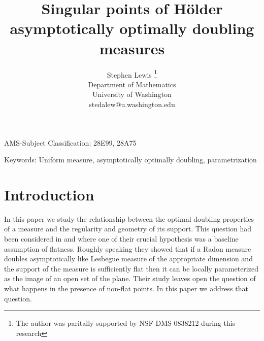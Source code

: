 \documentclass[11pt]{article}
\theoremstyle{definition}
\numberwithin{equation}{section}
\begin{document}
\title{Singular points of H\"older asymptotically optimally doubling measures}
\author{Stephen Lewis
\footnote{The author was paritally supported by NSF DMS 0838212 during this research}
\\ Department of Mathematics\\ University of Washington\\  \textsf{stedalew@u.washington.edu}
}


\date{}

\maketitle


\vspace{10pt}

\noindent AMS-Subject Classification: 28E99, 28A75

\noindent Keywords: Uniform measure, asymptotically optimally doubling, parametrization

\section{Introduction}



In this paper we study the relationship between the optimal doubling properties of a measure and the regularity and geometry of its support. This question had been considered in \cite{DKT} and \cite{PTT} where one of their crucial hypothesis was a baseline assumption of flatness. Roughly speaking they showed that if a Radon measure doubles asymptotically like Lesbegue measure of the appropriate dimension and the support of the measure is sufficiently flat then it can be locally parameterized as the image of an open set of the plane. Their study leaves open the question of what happens in the presence of non-flat points. In this paper we address that question.
\end{document}
